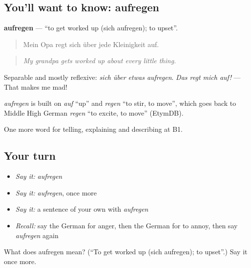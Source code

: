 \subsection*{You'll want to know: aufregen}
\textbf{aufregen} — \textquotedblleft{}to get worked up (sich aufregen); to upset\textquotedblright{}.

\begin{quote}
Mein Opa regt sich über jede Kleinigkeit auf.
\end{quote}

\begin{quote}
\emph{My grandpa gets worked up about every little thing.}
\end{quote}

Separable and mostly reflexive: \emph{sich über etwas aufregen}. \emph{Das regt mich auf!} — That makes me mad!

\begin{cousinweb}
\emph{aufregen} is built on \emph{auf} \textquotedblleft{}up\textquotedblright{} and \emph{regen} \textquotedblleft{}to stir, to move\textquotedblright{}, which goes back to Middle High German \emph{regen} \textquotedblleft{}to excite, to move\textquotedblright{} (EtymDB).
\end{cousinweb}

\begin{grammarlens}[title={What you've built}]
One more word for telling, explaining and describing at B1.
\end{grammarlens}

\subsection*{Your turn}
\begin{itemize}
\raggedright
  \item \emph{Say it:} \emph{aufregen}
  \item \emph{Say it:} \emph{aufregen}, once more
  \item \emph{Say it:} a sentence of your own with \emph{aufregen}
  \item \emph{Recall:} say the German for anger, then the German for to annoy, then say \emph{aufregen} again
\end{itemize}

\begin{tcolorbox}[breakable,colback=teal!4,colframe=teal!35!black,title={Before you move on}]
What does aufregen mean? (\textquotedblleft{}To get worked up (sich aufregen); to upset\textquotedblright{}.) Say it once more.
\end{tcolorbox}
